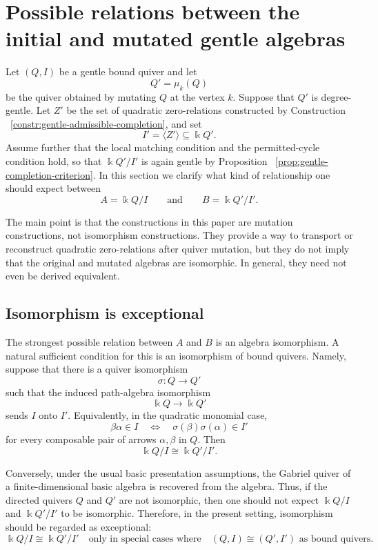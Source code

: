 \documentclass[11pt]{article}
\newcommand{\K}{\Bbbk}
\theoremstyle{plain}
\theoremstyle{definition}
\theoremstyle{remark}
\begin{document}
\section{Possible relations between the initial and mutated gentle algebras}
\label{sec:comparison-mutated-algebras}

Let \((Q,I)\) be a gentle bound quiver and let
\[
  Q'=\mu_k(Q)
\]
be the quiver obtained by mutating \(Q\) at the vertex \(k\).  Suppose that
\(Q'\) is degree-gentle.  Let \(Z'\) be the set of quadratic zero-relations
constructed by 
Construction ~\ref{constr:gentle-admissible-completion}, and set
\[
  I'=\langle Z'\rangle\subseteq \K Q'.
\]
Assume further that the local matching condition and the permitted-cycle
condition hold, so that \(\K Q'/I'\) is again gentle by
Proposition ~\ref{prop:gentle-completion-criterion}.  In this section we clarify what kind of
relationship one should expect between
\[
  A=\K Q/I
  \qquad\text{and}\qquad
  B=\K Q'/I'.
\]

The main point is that the constructions in this paper are mutation
constructions, not isomorphism constructions.  They provide a way to transport
or reconstruct quadratic zero-relations after quiver mutation, but they do not
imply that the original and mutated algebras are isomorphic.  In general, they
need not even be derived equivalent.

\subsection{Isomorphism is exceptional}

The strongest possible relation between \(A\) and \(B\) is an algebra
isomorphism.  A natural sufficient condition for this is an isomorphism of
bound quivers.  Namely, suppose that there is a quiver isomorphism
\[
  \sigma:Q\longrightarrow Q'
\]
such that the induced path-algebra isomorphism
\[
  \K Q\longrightarrow \K Q'
\]
sends \(I\) onto \(I'\).  Equivalently, in the quadratic monomial case,
\[
  \beta\alpha\in I
  \quad\Longleftrightarrow\quad
  \sigma(\beta)\sigma(\alpha)\in I'
\]
for every composable pair of arrows \(\alpha,\beta\) in \(Q\).  Then
\[
  \K Q/I\cong \K Q'/I'.
\]

Conversely, under the usual basic presentation assumptions, the Gabriel quiver
of a finite-dimensional basic algebra is recovered from the algebra.  Thus, if
the directed quivers \(Q\) and \(Q'\) are not isomorphic, then one should not
expect \(\K Q/I\) and \(\K Q'/I'\) to be isomorphic.  Therefore, in the present
setting, isomorphism should be regarded as exceptional:
\[
  \boxed{
  \K Q/I \cong \K Q'/I'
  \quad\text{only in special cases where}\quad
  (Q,I)\cong (Q',I')
  \text{ as bound quivers.}
  }
\]
\end{document}
